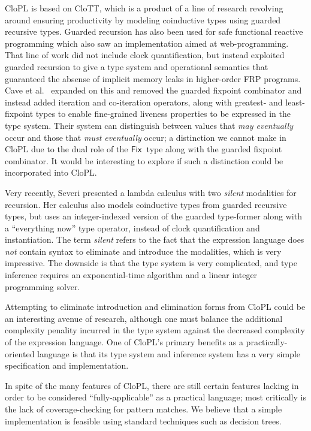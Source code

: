 \documentclass[sigplan,9pt,review]{acmart}\settopmatter{printfolios=true,printccs=false,printacmref=false}
\newcommand{\clott}{\textsf{CloTT}\xspace}
\newcommand{\clopl}{\textsf{CloPL}\xspace}
\begin{document}
\clopl is based on \clott, which is a product of a line of research
\cite{atkey2013productive,bizjak2015guarded,clouston2015programming} revolving around ensuring
productivity by modeling coinductive types using guarded recursive types.
Guarded recursion \cite{nakano2000modality} has also been used for safe functional reactive
programming \cite{krishnaswami2011ultrametric,simple-frp} which also saw an
implementation aimed at web-programming. That line of work did not include clock quantification,
but instead exploited guarded recursion to give a type system and operational semantics
that guaranteed the absense of implicit memory leaks in higher-order FRP programs.
Cave et al.~\cite{cave2014fair}
expanded on this and removed the guarded fixpoint combinator and instead added iteration
and co-iteration operators, along with greatest- and least-fixpoint types to
enable fine-grained liveness properties to be expressed in the type system. Their
system can distinguish between values that \emph{may eventually} occur and those that
\emph{must eventually} occur; a distinction we cannot make in \clopl due to the dual
role of the $\mathsf{Fix}\,$ type along with the guarded fixpoint combinator. It would be
interesting to explore if such a distinction could be incorporated into \clopl.

Very recently, Severi \cite{severi2017light, severi2017two} presented a lambda calculus with two \emph{silent} modalities
for recursion. Her calculus also models coinductive types from guarded recursive types,
but uses an integer-indexed version of the guarded type-former along with a
``everything now'' type operator, instead of clock quantification and instantiation.
The term \emph{silent} refers to the fact that the expression language does \emph{not}
contain syntax to eliminate and introduce the modalities, which is very impressive.
The downside is that the type system is very complicated, and type inference requires an
exponential-time algorithm and a linear integer programming solver.

Attempting to eliminate introduction and elimination forms from \clopl could be
an interesting avenue of research, although one must balance the additional complexity
penality incurred in the type system against the decreased complexity of the expression
language. One of \clopl's primary benefits as a practically-oriented language is that
its type system and inference system has a very simple specification and implementation.

In spite of the many features of \clopl, there are still certain features lacking in
order to be considered ``fully-applicable'' as a practical language; most critically is
the lack of coverage-checking for pattern matches. We believe that a simple implementation
is feasible using standard techniques such as decision trees.
\end{document}
